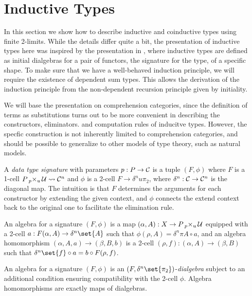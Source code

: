 \documentclass[../thesis.tex]{subfiles}
\begin{document}
\section{Inductive Types}
In this section we show how to describe inductive and coinductive types using finite 2-limits. While the details
differ quite a
bit, the presentation of inductive types here was inspired by the presentation in \cite{basold2015}, where
inductive types are defined as initial dialgebras for a pair of functors, the signature for the type, of a
specific shape. To make sure that we have a well-behaved induction principle, we will require the existence
of dependent sum types. This allows the derivation of the induction principle from the non-dependent recursion
principle given by initiality.

We will base the presentation on comprehension categories, since the definition of terms as substitutions
turns out to be more convenient in describing the constructors, eliminators. and computation rules of
inducitve types. However, the specfic construction is not inherently limited to comprehension categories,
and should be possible to generalize to other models of type theory, such as natural models.

\begin{definition}
  A \emph{data type signature} with parameters $p : P \to \cC$ is a tuple $(F,\phi)$ where $F$ is a 1-cell
  $P \pb[p]{u} \cU \loose \cC^n$ and $\phi$ is a 2-cell $F \to \delta^n u \pi_2$, where $\delta^n : \cC
  \to \cC^n$ is the diagonal map. The intuition is that $F$ determines the arguments for each constructor
  by extending the given context, and $\phi$ connects the extend context back to the original one to
  facilitate the elimination rule.

  An algebra for a signature $(F,\phi)$ is a map $(\alpha, A) : X \to P \pb[p]{u} \cU$ equipped with a 2-cell
  $a : F(\alpha,A) \to \delta^n\set{A}$ such that $\phi(\rho,A) = \delta^n\pi A \circ a$, and an algebra homomorphism
  $(\alpha,A,a) \to (\beta, B,b)$ is a 2-cell $(\rho,f) : (\alpha,A) \to (\beta,B)$ such that $\delta^n\set{f}
  \circ a = b \circ F(\rho,f)$.
\end{definition}
\begin{remark}
  An algebra for a signature $(F,\phi)$ is an $(F,\delta^n\set{\pi_2})$-\emph{dialgebra} subject to an
  additional condition ensuring compatibility with the 2-cell $\phi$. Algebra homomorphisms are exactly
  maps of dialgebras. 
\end{remark}
\end{document}

